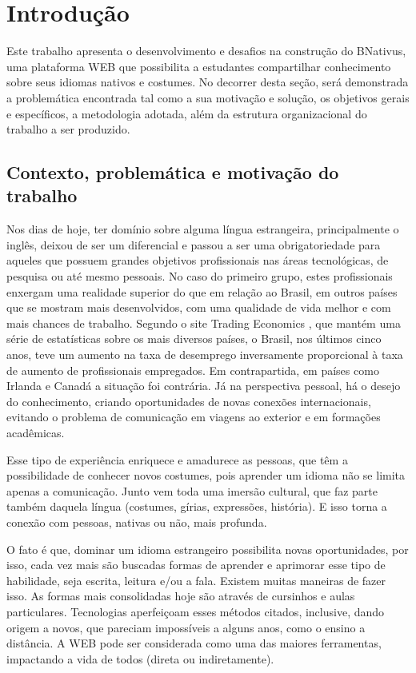 \chapter{Introdução}

Este trabalho apresenta o desenvolvimento e desafios na construção do BNativus,  uma plataforma WEB que possibilita a estudantes compartilhar conhecimento sobre seus idiomas nativos e costumes. No decorrer desta seção, será demonstrada a problemática encontrada tal como a sua motivação e solução, os objetivos gerais e específicos, a metodologia adotada, além da estrutura organizacional do trabalho a ser produzido.

\section{Contexto, problemática e motivação do trabalho}

Nos dias de hoje, ter domínio sobre alguma língua estrangeira, principalmente o inglês, deixou de ser um diferencial e passou a ser uma obrigatoriedade para aqueles que possuem grandes objetivos profissionais nas áreas tecnológicas, de pesquisa ou até mesmo pessoais. No caso do primeiro grupo, estes profissionais enxergam uma realidade superior do que em relação ao Brasil, em outros países que se mostram mais desenvolvidos, com uma qualidade de vida melhor e com mais chances de trabalho. Segundo o site Trading Economics \cite{Trading}, que mantém uma série de estatísticas sobre os mais diversos países, o Brasil, nos últimos cinco anos, teve um aumento na taxa de desemprego inversamente proporcional à taxa de aumento de profissionais empregados. Em contrapartida, em países como Irlanda e Canadá a situação foi contrária. Já na perspectiva pessoal, há o desejo do conhecimento, criando oportunidades de novas conexões internacionais, evitando o problema de comunicação em viagens ao exterior e em formações acadêmicas.

Esse tipo de experiência enriquece e amadurece as pessoas, que têm a possibilidade de conhecer novos costumes, pois aprender um idioma não se limita apenas a comunicação. Junto vem toda uma imersão cultural, que faz parte também daquela língua (costumes, gírias, expressões, história). E isso torna a conexão com pessoas, nativas ou não, mais profunda.

O fato é que, dominar um idioma estrangeiro possibilita novas oportunidades, por isso, cada vez mais são buscadas formas de aprender e aprimorar esse tipo de habilidade, seja escrita, leitura e/ou a fala. Existem muitas maneiras de fazer isso. As formas mais consolidadas hoje são através de cursinhos e aulas particulares. Tecnologias aperfeiçoam esses métodos citados, inclusive, dando origem a novos, que pareciam impossíveis a alguns anos, como o ensino a distância. A WEB pode ser considerada como uma das maiores ferramentas, impactando a vida de todos (direta ou indiretamente).

